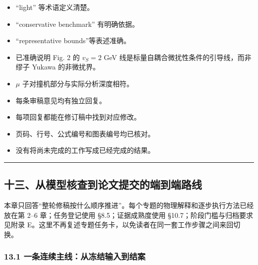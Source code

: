 \documentclass[
  chinese,
  UTF8]{ctexart}
\providecommand{\tightlist}{%
  \setlength{\itemsep}{0pt}\setlength{\parskip}{0pt}}
\begin{document}
\begin{itemize}
\tightlist
\item[$\square$]
  ``light'' 等术语定义清楚。
\item[$\square$]
  ``conservative benchmark'' 有明确依据。
\item[$\square$]
  ``representative bounds''等表述准确。
\item[$\square$]
  已准确说明 Fig. 2 的 \(v_S=2\) GeV
  线是标量自耦合微扰性条件的引导线，而非缪子 Yukawa 的非微扰界。
\item[$\square$]
  \ensuremath{\mu} 子对撞机部分与实际分析深度相符。
\item[$\square$]
  每条审稿意见均有独立回复。
\item[$\square$]
  每项回复都能在修订稿中找到对应修改。
\item[$\square$]
  页码、行号、公式编号和图表编号均已核对。
\item[$\square$]
  没有将尚未完成的工作写成已经完成的结果。
\end{itemize}

\begin{center}\rule{0.5\linewidth}{0.5pt}\end{center}

\subsection{十三、从模型核查到论文提交的端到端路线}\label{ux5341ux4e09ux4eceux6a21ux578bux6838ux67e5ux5230ux8bbaux6587ux63d0ux4ea4ux7684ux7aefux5230ux7aefux8defux7ebf}

本章只回答``整轮修稿按什么顺序推进''。每个专题的物理解释和逐步执行方法已经放在第
2--6 章；任务登记使用 §8.5；证据成熟度使用
§10.7；阶段门槛与归档要求见附录
E。这里不再复述专题任务卡，以免读者在同一套工作步骤之间来回切换。

\subsubsection{13.1
一条连续主线：从冻结输入到结案}\label{ux4e00ux6761ux8fdeux7eedux4e3bux7ebfux4eceux51bbux7ed3ux8f93ux5165ux5230ux7ed3ux6848}
\end{document}
